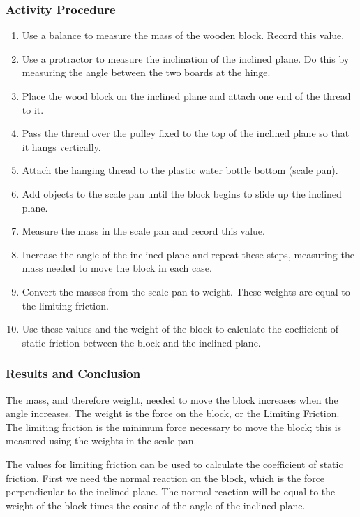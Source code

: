 \subsubsection*{Activity Procedure}
\begin{enumerate}
\item{Use a balance to measure the mass of the wooden block. Record this value.} 
\item{Use a protractor to measure the inclination of the inclined plane. Do this by measuring the angle between the two boards at the hinge.} 
\item{Place the wood block on the inclined plane and attach one end of the thread to it.} 
\item{Pass the thread over the pulley fixed to the top of the inclined plane so that it hangs vertically.} 
\item{Attach the hanging thread to the plastic water bottle bottom (scale pan).} 
\item{Add objects to the scale pan until the block begins to slide up the inclined plane.} 
\item{Measure the mass in the scale pan and record this value.} 
\item{Increase the angle of the inclined plane and repeat these steps, measuring the mass needed to move the block in each case.} 
\item{Convert the masses from the scale pan to weight. These weights are equal to the limiting friction.} 
\item{Use these values and the weight of the block to calculate the coefficient of static friction between the block and the inclined plane.} 
\end{enumerate}

\subsubsection*{Results and Conclusion}
The mass, and therefore weight, needed to move the block increases when the angle increases. The weight is the force on the block, or the Limiting Friction. The limiting friction is the minimum force necessary to move the block; this is measured using the weights in the scale pan.  

The values for limiting friction can be used to calculate the coefficient of static friction. First we need the normal reaction on the block, which is the force perpendicular to the inclined plane. The normal reaction will be equal to the weight of the block times the cosine of the angle of the inclined plane.  

